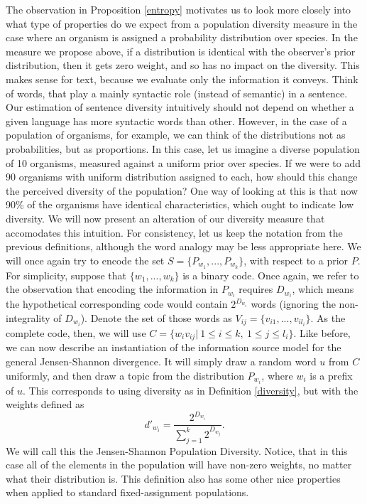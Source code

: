 The observation in Proposition \ref{entropy} motivates us to look more closely into what type of
properties do we expect from a population diversity measure in the
case where an organism is assigned a probability distribution
over species. In the measure we propose above, if a distribution is
identical with the observer's prior distribution, then it gets zero
weight, and so has no impact on the diversity. This makes sense for
text, because we evaluate only the information it conveys. Think of
words, that play a mainly syntactic role (instead of semantic) in a
sentence. Our estimation of sentence diversity intuitively should not
depend on whether a given language has more syntactic words than
other. However, in
the case of a population of organisms, for example, we can think of
the distributions not as probabilities, but as proportions. In this
case, let us imagine a diverse population of 10 organisms, measured
against a uniform prior over species. If we were to add 90 organisms
with uniform distribution assigned to each, how should this change the
perceived diversity of the population? One way of looking at this is
that now 90\% of the organisms have identical characteristics, which
ought to indicate low diversity. We will now present an alteration of
our diversity measure that accomodates this intuition. For
consistency, let us keep the notation from the previous definitions,
although the word analogy may be less appropriate here. We will once
again try to encode the set $S=\{P_{w_1},...,P_{w_k}\}$, with respect
to a prior $P$. For simplicity, suppose that $\{w_1,...,w_k\}$ is a
binary code. Once again, we refer to the observation that encoding the
information in $P_{w_i}$ requires $D_{w_i}$, which means the
hypothetical corresponding code would contain $2^{D_{w_i}}$ words 
(ignoring the non-integrality of $D_{w_i}$). Denote the set of those
words as $V_{ij}=\{v_{i1},...,v_{il_i}\}$. As the complete code, then,
we will use $C=\{w_iv_{ij}|\ 1\leq i\leq k,\ 1\leq j\leq l_i\}$. Like
before, we can now describe an instantiation of the information source
model for the general Jensen-Shannon divergence. It will simply draw a
random word $u$ from $C$ uniformly, and then draw a topic from the
distribution $P_{w_i}$, where $w_i$ is a prefix of $u$. This
corresponds to using diversity as in Definition \ref{diversity}, but
with the weights  defined as
\[d'_{w_i}=\frac{2^{D_{w_i}}}{\sum_{j=1}^k2^{D_{w_j}}}.\]
We will call this the Jensen-Shannon Population Diversity. Notice,
that in this case all of the elements in the population will have
non-zero weights, no matter what their distribution is. This
definition also has some other nice properties when applied to
standard fixed-assignment populations. 

